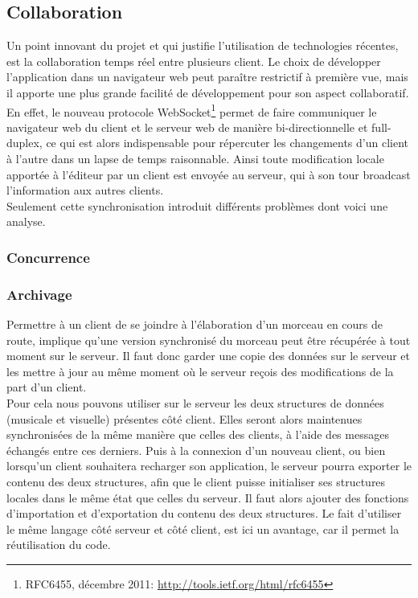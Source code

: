 \documentclass[12pt,a4paper]{article}
\begin{document}
\subsection{Collaboration}

Un point innovant du projet et qui justifie l’utilisation de technologies récentes, est la collaboration temps réel entre plusieurs client. Le choix de développer l’application dans un navigateur web peut paraître restrictif à première vue, mais il apporte une plus grande facilité de développement pour son aspect collaboratif.\\
En effet, le nouveau protocole WebSocket\footnote{RFC6455, décembre 2011: \url{http://tools.ietf.org/html/rfc6455}} permet de faire communiquer le navigateur web du client et le serveur web de manière bi-directionnelle et full-duplex, ce qui est alors indispensable pour répercuter les changements d’un client à l’autre dans un lapse de temps raisonnable. Ainsi toute modification locale apportée à l’éditeur par un client est envoyée au serveur, qui à son tour broadcast l’information aux autres clients.\\
Seulement cette synchronisation introduit différents problèmes dont voici une analyse.

\subsubsection{Concurrence}

\subsubsection{Archivage}

Permettre à un client de se joindre à l’élaboration d’un morceau en cours de route, implique qu’une version synchronisé du morceau peut être récupérée à tout moment sur le serveur. Il faut donc garder une copie des données sur le serveur et les mettre à jour au même moment où le serveur reçois des modifications de la part d’un client.\\
Pour cela nous pouvons utiliser sur le serveur les deux structures de données (musicale et visuelle) présentes côté client. Elles seront alors maintenues synchronisées de la même manière que celles des clients, à l’aide des messages échangés entre ces derniers. Puis à la connexion d’un nouveau client, ou bien lorsqu’un client souhaitera recharger son application, le serveur pourra exporter le contenu des deux structures, afin que le client puisse initialiser ses structures locales dans le même état que celles du serveur. Il faut alors ajouter des fonctions d’importation et d’exportation du contenu des deux structures. Le fait d’utiliser le même langage côté serveur et côté client, est ici un avantage, car il permet la réutilisation du code.
\end{document}
